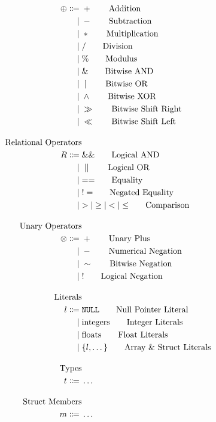 \begin{align*}
  \oplus \mathrel{\Coloneqq} {} & + \tag*{Addition} \\
  \mathrel{\mid} {} & - \tag*{Subtraction} \\
  \mathrel{\mid} {} & * \tag*{Multiplication} \\
  \mathrel{\mid} {} & / \tag*{Division} \\
  \mathrel{\mid} {} & \% \tag*{Modulus} \\
  \mathrel{\mid} {} & \& \tag*{Bitwise AND} \\
  \mathrel{\mid} {} & \mid \tag*{Bitwise OR} \\
  \mathrel{\mid} {} & \wedge \tag*{Bitwise XOR} \\
  \mathrel{\mid} {} & \gg \tag*{Bitwise Shift Right} \\
  \mathrel{\mid} {} & \ll \tag*{Bitwise Shift Left} \\[1em]  
  \text{Relational Operators} \\*
  R \mathrel{\Coloneqq} {} & \&\& \tag*{Logical AND} \\
  \mathrel{\mid} {} & \mid\mid \tag*{Logical OR} \\
  \mathrel{\mid} {} & \mathord{==} \tag*{Equality} \\
  \mathrel{\mid} {} & \mathord{!=} \tag*{Negated Equality} \\
  \mathrel{\mid} {} & \mathord{>} \mathrel{\mid}
             \mathord{\ge} \mathrel{\mid}
             \mathord{<} \mathrel{\mid}
             \mathord{\le} \tag*{Comparison} \\[1em]
  \text{Unary Operators} \\*
  \otimes \mathrel{\Coloneqq} {} & + \tag*{Unary Plus} \\
  \mathrel{\mid} {} & - \tag*{Numerical Negation} \\
  \mathrel{\mid} {} & \sim \tag*{Bitwise Negation} \\
  \mathrel{\mid} {} & ! \tag*{Logical Negation} \\[1em]
  \text{Literals} \\*
  l \mathrel{\Coloneqq} {} & \mathtt{NULL} \tag*{Null Pointer Literal} \\
  \mathrel{\mid} {} & \mathrm{integers} \tag*{Integer Literals} \\
  \mathrel{\mid} {} & \mathrm{floats} \tag*{Float Literals} \\
  \mathrel{\mid} {} & \{ l , \dots \} \tag*{Array \& Struct Literals} \\[1em]
  \text{Types} \\*
  t \mathrel{\Coloneqq} {} & \dots \\[1em]
  \text{Struct Members} \\*
  m \mathrel{\Coloneqq} {} & \dots \\
\end{align*}

